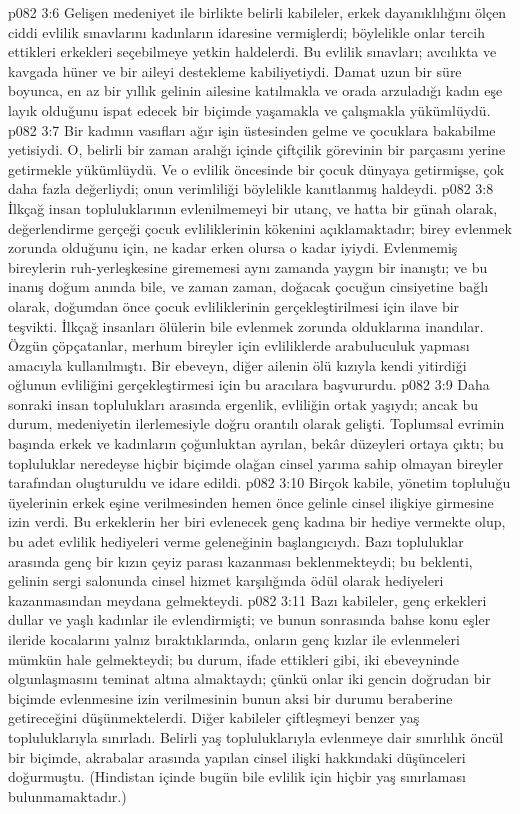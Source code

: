 \vs p082 3:6 Gelişen medeniyet ile birlikte belirli kabileler, erkek dayanıklılığını ölçen ciddi evlilik sınavlarını kadınların idaresine vermişlerdi; böylelikle onlar tercih ettikleri erkekleri seçebilmeye yetkin haldelerdi. Bu evlilik sınavları; avcılıkta ve kavgada hüner ve bir aileyi destekleme kabiliyetiydi. Damat uzun bir süre boyunca, en az bir yıllık gelinin ailesine katılmakla ve orada arzuladığı kadın eşe layık olduğunu ispat edecek bir biçimde yaşamakla ve çalışmakla yükümlüydü.
\vs p082 3:7 Bir kadının vasıfları ağır işin üstesinden gelme ve çocuklara bakabilme yetisiydi. O, belirli bir zaman aralığı içinde çiftçilik görevinin bir parçasını yerine getirmekle yükümlüydü. Ve o evlilik öncesinde bir çocuk dünyaya getirmişse, çok daha fazla değerliydi; onun verimliliği böylelikle kanıtlanmış haldeydi.
\vs p082 3:8 İlkçağ insan topluluklarının evlenilmemeyi bir utanç, ve hatta bir günah olarak, değerlendirme gerçeği çocuk evliliklerinin kökenini açıklamaktadır; birey evlenmek zorunda olduğunu için, ne kadar erken olursa o kadar iyiydi. Evlenmemiş bireylerin ruh\hyp{}yerleşkesine girememesi aynı zamanda yaygın bir inanıştı; ve bu inanış doğum anında bile, ve zaman zaman, doğacak çocuğun cinsiyetine bağlı olarak, doğumdan önce çocuk evliliklerinin gerçekleştirilmesi için ilave bir teşvikti. İlkçağ insanları ölülerin bile evlenmek zorunda olduklarına inandılar. Özgün çöpçatanlar, merhum bireyler için evliliklerde arabuluculuk yapması amacıyla kullanılmıştı. Bir ebeveyn, diğer ailenin ölü kızıyla kendi yitirdiği oğlunun evliliğini gerçekleştirmesi için bu aracılara başvururdu.
\vs p082 3:9 Daha sonraki insan toplulukları arasında ergenlik, evliliğin ortak yaşıydı; ancak bu durum, medeniyetin ilerlemesiyle doğru orantılı olarak gelişti. Toplumsal evrimin başında erkek ve kadınların çoğunluktan ayrılan, bekâr düzeyleri ortaya çıktı; bu topluluklar neredeyse hiçbir biçimde olağan cinsel yarıma sahip olmayan bireyler tarafından oluşturuldu ve idare edildi.
\vs p082 3:10 Birçok kabile, yönetim topluluğu üyelerinin erkek eşine verilmesinden hemen önce gelinle cinsel ilişkiye girmesine izin verdi. Bu erkeklerin her biri evlenecek genç kadına bir hediye vermekte olup, bu adet evlilik hediyeleri verme geleneğinin başlangıcıydı. Bazı topluluklar arasında genç bir kızın çeyiz parası kazanması beklenmekteydi; bu beklenti, gelinin sergi salonunda cinsel hizmet karşılığında ödül olarak hediyeleri kazanmasından meydana gelmekteydi.
\vs p082 3:11 Bazı kabileler, genç erkekleri dullar ve yaşlı kadınlar ile evlendirmişti; ve bunun sonrasında bahse konu eşler ileride kocalarını yalnız bıraktıklarında, onların genç kızlar ile evlenmeleri mümkün hale gelmekteydi; bu durum, ifade ettikleri gibi, iki ebeveyninde olgunlaşmasını teminat altına almaktaydı; çünkü onlar iki gencin doğrudan bir biçimde evlenmesine izin verilmesinin bunun aksi bir durumu beraberine getireceğini düşünmektelerdi. Diğer kabileler çiftleşmeyi benzer yaş topluluklarıyla sınırladı. Belirli yaş topluluklarıyla evlenmeye dair sınırlılık öncül bir biçimde, akrabalar arasında yapılan cinsel ilişki hakkındaki düşünceleri doğurmuştu. (Hindistan içinde bugün bile evlilik için hiçbir yaş sınırlaması bulunmamaktadır.)
